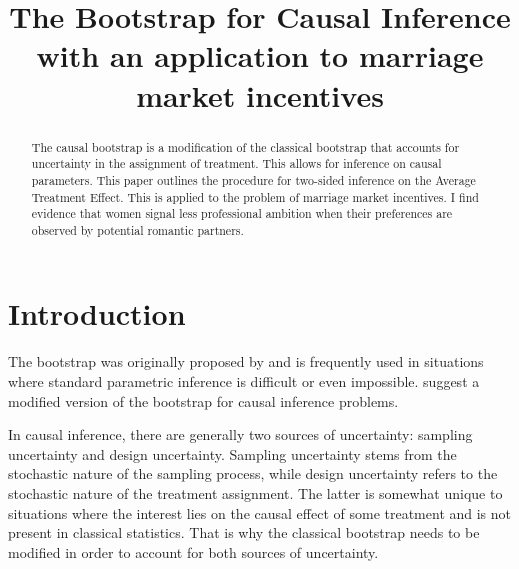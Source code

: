\documentclass[aodsor,preprint]{imsart}
\numberwithin{equation}{section}
\theoremstyle{plain}
\begin{document}
\begin{frontmatter}
\title{The Bootstrap for Causal Inference with an application to marriage market incentives}

\begin{aug}
\author{ }





\end{aug}

\begin{abstract}
The causal bootstrap is a modification of the classical bootstrap that accounts for uncertainty in the assignment of treatment. This allows for inference on causal parameters. This paper outlines the procedure for two-sided inference on the Average Treatment Effect.
This is applied to the problem of marriage market incentives. I find evidence that women signal less professional ambition when their preferences are observed by potential romantic partners.
\end{abstract}

\begin{keyword}[class=MSC]
\end{keyword}

\begin{keyword}
\end{keyword}

\end{frontmatter}

\section{Introduction}



The bootstrap was originally proposed by \cite{Efron_1982} and is frequently used in situations where standard parametric inference is difficult or even impossible. \cite{Imbens_2021} suggest a modified version of the bootstrap for causal inference problems.

In causal inference, there are generally two sources of uncertainty: sampling uncertainty and design uncertainty. Sampling uncertainty stems from the stochastic nature of the sampling process, while design uncertainty refers to the stochastic nature of the treatment assignment. The latter is somewhat unique to situations where the interest lies on the causal effect of some treatment and is not present in classical statistics. That is why the classical bootstrap needs to be modified in order to account for both sources of uncertainty.
\end{document}
